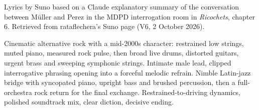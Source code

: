 
\begin{notes}
Lyrics by Suno based on a Claude explanatory summary of the conversation between Müller and Perez in the MDPD interrogation room in \emph{Ricochets}, chapter 6. Retrieved from rataflechera’s Suno page (V6, 2 October 2026).
\end{notes}
\begin{style}
Cinematic alternative rock with a mid-2000s character: restrained low strings, muted piano, measured rock pulse, then broad live drums, distorted guitars, urgent brass and sweeping symphonic strings. Intimate male lead, clipped interrogative phrasing opening into a forceful melodic refrain. Nimble Latin-jazz bridge with syncopated piano, upright bass and brushed percussion, then a full-orchestra rock return for the final exchange. Restrained-to-driving dynamics, polished soundtrack mix, clear diction, decisive ending.
\end{style}
